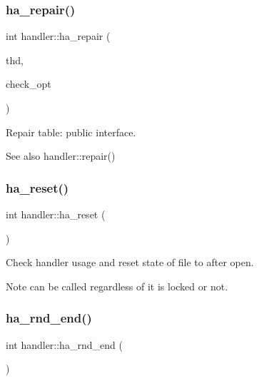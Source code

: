 \subsubsection{\texorpdfstring{ha\+\_\+repair()}{ha\_repair()}}
{\footnotesize\ttfamily int handler\+::ha\+\_\+repair (\begin{DoxyParamCaption}\item[{T\+HD $\ast$}]{thd,  }\item[{\mbox{\hyperlink{structst__ha__check__opt}{H\+A\+\_\+\+C\+H\+E\+C\+K\+\_\+\+O\+PT}} $\ast$}]{check\+\_\+opt }\end{DoxyParamCaption})}

Repair table\+: public interface.

\begin{DoxySeeAlso}{See also}
handler\+::repair() 
\end{DoxySeeAlso}
\mbox{\label{classhandler_a53d38f167906d8aaa9e560c71e595a42}} 
\subsubsection{\texorpdfstring{ha\+\_\+reset()}{ha\_reset()}}
{\footnotesize\ttfamily int handler\+::ha\+\_\+reset (\begin{DoxyParamCaption}{ }\end{DoxyParamCaption})}



Check handler usage and reset state of file to after \textquotesingle{}open\textquotesingle{}. 

\begin{DoxyNote}{Note}
can be called regardless of it is locked or not. 
\end{DoxyNote}
\mbox{\label{classhandler_ad4d9bf34ac0a004d8c5c32267f20842f}} 
\subsubsection{\texorpdfstring{ha\+\_\+rnd\+\_\+end()}{ha\_rnd\_end()}}
{\footnotesize\ttfamily int handler\+::ha\+\_\+rnd\+\_\+end (\begin{DoxyParamCaption}{ }\end{DoxyParamCaption})}

